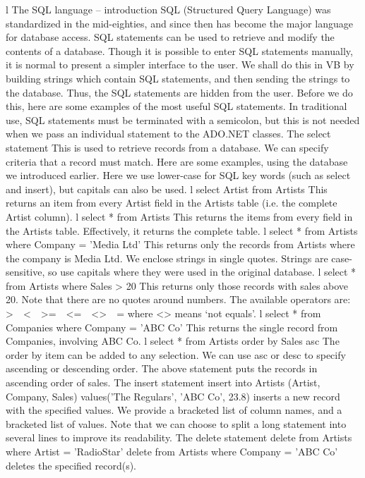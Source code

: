 l	The SQL language – introduction
SQL (Structured Query Language) was standardized in the mid-eighties, and since then has become the major language for database access. SQL statements can be used to retrieve and modify the contents of a database. Though it is possible to enter SQL statements manually, it is normal to present a simpler interface to the user. We shall do this in VB by building strings which contain SQL statements, and then sending the strings to the database. Thus, the SQL statements are hidden from the user.
Before we do this, here are some examples of the most useful SQL statements. In traditional use, SQL statements must be terminated with a semicolon, but this is not needed when we pass an individual statement to the ADO.NET classes.
The select statement
This is used to retrieve records from a database. We can specify criteria that a record must match. Here are some examples, using the database we introduced earlier. Here we use lower-case for SQL key words (such as select and insert), but capitals can also be used.
l	select Artist from Artists
	This returns an item from every Artist ﬁeld in the Artists table (i.e. the complete Artist column).
l	select * from Artists
	This returns the items from every ﬁeld in the Artists table. Effectively, it returns the complete table.
l	select * from Artists where Company = 'Media Ltd'
	This returns only the records from Artists where the company is Media Ltd. We enclose strings in single quotes. Strings are case-sensitive, so use capitals where they were used in the original database.
l	select * from Artists where Sales > 20
	This returns only those records with sales above 20. Note that there are no quotes around numbers. The available operators are:
	>  <  >=  <=  <>  =
	where <> means ‘not equals’.
l	select * from Companies where Company = 'ABC Co'
	This returns the single record from Companies, involving ABC Co.
l	select * from Artists order by Sales asc
	The order by item can be added to any selection. We can use asc or desc to specify ascending or descending order. The above statement puts the records in ascending order of sales.
The insert statement
insert into Artists (Artist, Company, Sales)
	values('The Regulars', 'ABC Co', 23.8)
inserts a new record with the speciﬁed values. We provide a bracketed list of column names, and a bracketed list of values. Note that we can choose to split a long statement into several lines to improve its readability.
The delete statement
delete from Artists where Artist = 'RadioStar'
delete from Artists where Company = 'ABC Co'
deletes the speciﬁed record(s).
